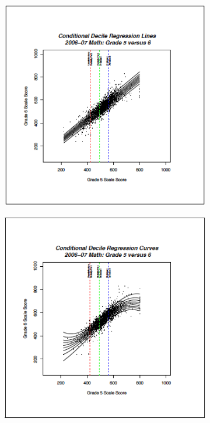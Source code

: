 \documentclass[12pt]{article}
\begin{document}
\begin{figure}[H]
\caption*{\label{fig:quantPlot} {\bf{Fig. B.2:}} Linear and B-spline conditional deciles based upon bivariate math data, grades 5 and 6.}
  \begin{subfigure}[b]{0.5\textwidth}
    \includegraphics[width=\textwidth]{../img/Appendices/SGP_Method/linearquantileplot.png}
  \end{subfigure}
  \begin{subfigure}[b]{0.5\textwidth}
    \includegraphics[width=\textwidth]{../img/Appendices/SGP_Method/bsplinequantileplot.png}
  \end{subfigure}
\end{figure}
\end{document}

